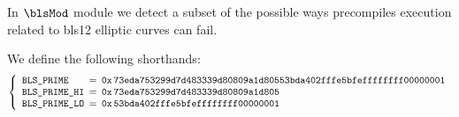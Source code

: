 In $\blsMod$ module we detect a subset of the possible ways precompiles execution related to bls12 elliptic curves can fail. 

We define the following shorthands:
\[
    \left\{
    \begin{array}{lcl}
        \blsPrime
         & \!\!\! = \!\!\! & \blsPrimeHex                                                                         \\
        \blsPrimeHi
         & \!\!\! = \!\!\! & \blsPrimeHexHi                                                                       \\
        \blsPrimeLo
         & \!\!\! = \!\!\! & \blsPrimeHexLo                                                                       \\
    \end{array}
    \right.
\]